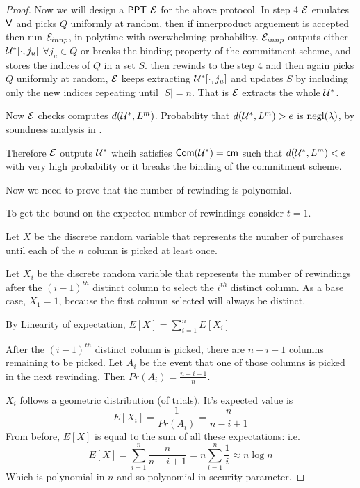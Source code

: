 \begin{proof}
	Now we will design a $\mathsf{PPT}$ $\mathcal{E}$ for the above protocol.
	In step 4 $\mathcal{E}$ emulates $\mathsf{V}$ and picks $Q$ uniformly at random, then if innerproduct arguement is accepted then run $\mathcal{E}_{innp}$, in polytime with overwhelming probability. $\mathcal{E}_{innp}$ outputs either $\mathcal{U}^*[\cdot,j_u]$ $\forall j_u\in Q$ or breaks the binding property of the commitment scheme, and stores the indices of $Q$ in a set $S$. then rewinds to the step 4 and then again picks $Q$ uniformly at random, $\mathcal{E}$ keeps extracting $\mathcal{U}^*[\cdot,j_u]$ and updates $S$ by including only the new indices repeating until $|S|=n$. That is $\mathcal{E}$ extracts the whole $\mathcal{U}^*$.
	
	Now $\mathcal{E}$ checks computes $d(\mathcal{U}^*, L^m)$. Probability that $d(\mathcal{U}^*,L^m) > e$ is $\mathrm{negl}(\lambda)$, by soundness analysis in \cite{Ligero2017}.
	
	Therefore $\mathcal{E}$ outputs $\mathcal{U}^*$ whcih satisfies $\mathsf{Com}(\mathcal{U}^*) = \mathsf{cm}$ such that $d(\mathcal{U}^*, L^m) < e$ with very high probability or it breaks the binding of the commitment scheme.
	
	Now we need to prove that the number of rewinding is polynomial.
	
	To get the bound on the expected number of rewindings consider $t=1$. 
	
	Let $X$ be the discrete random variable that represents the number of purchases until each of the $n$ column is picked at least once.
	
	Let $X_i$ be the discrete random variable that represents the number of rewindings after the $(i-1)^{th}$ distinct column to select the $i^{th}$ distinct column. As a base case, $X_1=1$, because the first column selected will always be distinct.
	
	By Linearity of expectation, $E[X]=\sum_{i=1}^{n}E[X_i]$
	
	After the $(i-1)^{th}$ distinct column is picked, there are $n-i+1$ columns remaining to be picked. Let $A_i$ be the event that one of those columns is picked in the next rewinding. Then $Pr(A_i)=\frac{n-i+1}{n}$.
	
	$X_i$ follows a geometric distribution (of trials). It's expected value is
	$$E[X_i]= \frac{1}{Pr(A_i)} = \frac{n}{n-i+1}$$
	From before, $E[X]$ is equal to the sum of all these expectations: i.e.
	$$E[X] = \sum\limits_{i=1}^{n} \frac{n}{n-i+1} = n\sum\limits_{i=1}^{n} \frac{1}{i} \approx n \log n$$
	Which is polynomial in $n$ and so polynomial in security parameter.
\end{proof}


